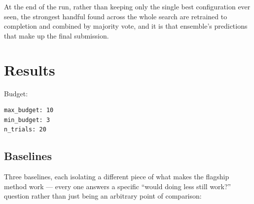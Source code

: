 \documentclass[10pt]{article}
\begin{document}
At the end of the run, rather than keeping only the single best configuration ever seen, the
strongest handful found across the whole search are retrained to completion and combined by
majority vote, and it is that ensemble's predictions that make up the final submission.

\section*{Results}

Budget:

\begin{verbatim}
max_budget: 10
min_budget: 3
n_trials: 20
\end{verbatim}

\subsection*{Baselines}

Three baselines, each isolating a different piece of what makes the flagship method work ---
every one answers a specific ``would doing less still work?'' question rather than just being an
arbitrary point of comparison:
\end{document}
